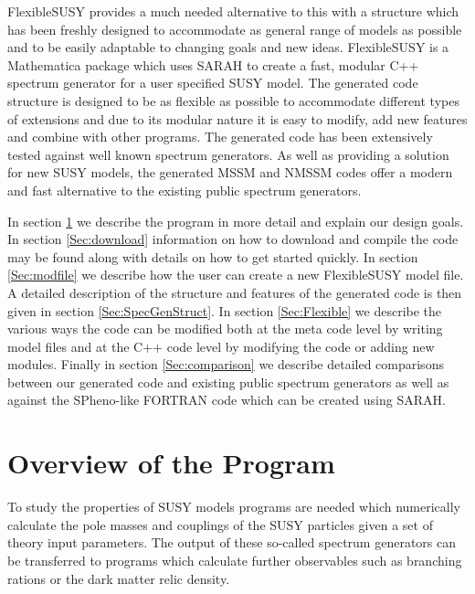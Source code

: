 \documentclass[final,3p,11pt,pdflatex]{elsarticle}
\makeatletter
\newcommand{\sarah}{SARAH\@\xspace}
\newcommand{\fs}{FlexibleSUSY\@\xspace}
\newcommand{\mathematica}{Mathematica\xspace}
\makeatother
\begin{document}
\fs provides a much needed alternative to this with a structure which
has been freshly designed to accommodate as general range of models as
possible and to be easily adaptable to changing goals and new
ideas. \fs is a \mathematica package which uses \sarah to create a
fast, modular C++ spectrum generator for a user specified SUSY model.
The generated code structure is designed to be as flexible as possible
to accommodate different types of extensions and due to its modular
nature it is easy to modify, add new features and combine with other
programs.  The generated code has been extensively tested against well
known spectrum generators. As well as providing a solution for new
SUSY models, the generated MSSM and NMSSM codes offer a modern and fast
alternative to the existing public spectrum generators.

In section \ref{Sec:Program} we describe the program in more detail
and explain our design goals.  In section \ref{Sec:download}
information on how to download and compile the code may be found along
with details on how to get started quickly.  In section
\ref{Sec:modfile} we describe how the user can create a new
FlexibleSUSY model file. A detailed description of the structure and
features of the generated code is then given in section
\ref{Sec:SpecGenStruct}.  In section \ref{Sec:Flexible} we describe
the various ways the code can be modified both at the meta code level
by writing model files and at the C++ code level by modifying the code
or adding new modules. Finally in section \ref{Sec:comparison} we
describe detailed comparisons between our generated code and existing
public spectrum generators as well as against the SPheno-like FORTRAN
code which can be created using SARAH.


\section{Overview of the Program}
\label{Sec:Program}

To study the properties of SUSY models programs are needed which
numerically calculate the pole masses and couplings of the SUSY
particles given a set of theory input parameters.  The output of these
so-called spectrum generators can be transferred to programs which
calculate further observables such as branching rations or the dark
matter relic density.
\end{document}
